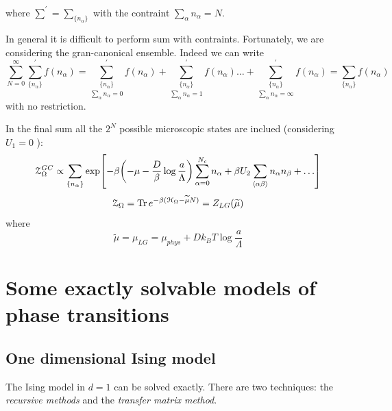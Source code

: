 \documentclass[../main/main.tex]{subfiles}
\begin{document}
where \( \sum_{}^{'} = \sum_{\{ n_ \alpha  \} }^{}     \)  with the contraint \( \sum_{\alpha }^{} n_ \alpha = N   \).
\begin{remark}
In general it is difficult to perform sum with contraints. Fortunately, we are considering the gran-canonical ensemble.
Indeed we can write
\begin{equation}
  \sum_{N=0}^{\infty} \sum_{\{ n_ \alpha  \}}^{'} f(n_ \alpha ) =   \underset{\sum_{\alpha }^{} n_ \alpha =0 }{\sum_{\{ n_ \alpha  \} }^{'}} f (n_ \alpha )  +
  \underset{\sum_{\alpha }^{} n_ \alpha =1 }{\sum_{\{ n_ \alpha  \} }^{'}} f (n_ \alpha )
  \dots +
    \underset{\sum_{\alpha }^{} n_ \alpha = \infty }{\sum_{\{ n_ \alpha  \} }^{'}} f (n_ \alpha ) =  \sum_{\{ n_ \alpha  \}} f(n_ \alpha )
\end{equation}
with no restriction.
\end{remark}
\begin{remark}
In the final sum all the \( 2^N \) possible microscopic states are inclued (considering \( U_1 =0 \) ):
\begin{equation}
  \mathcal{Z}_ \Omega ^{GC} \propto  \sum_{\{ n_ \alpha  \}} \exp [-\beta \qty(-\mu - \frac{D}{\beta } \log{\frac{a}{\Lambda }} ) \sum_{\alpha =0}^{N_c} n_ \alpha  + \beta U_2 \sum_{\expval{\alpha \beta } }^{} n_ \alpha n_ \beta + \dots     ]
\end{equation}
\begin{equation}
  \mathcal{Z}_ \Omega = \Tr e^{-\beta ( \mathcal{H}_ \Omega - \widetilde{\mu} N )} = Z_{LG} ( \widetilde{\mu } )
\end{equation}
where
\begin{equation}
  \widetilde{\mu } = \mu _{LG} = \mu _{phys} + D k_B T \log{\frac{a}{\Lambda }}
\end{equation}
\end{remark}
\clearpage



\chapter{Some exactly solvable models of phase transitions}

\section{One dimensional Ising model}
The Ising model in \( d=1 \) can be solved exactly. There are two techniques: the \emph{recursive methods} and the \emph{transfer matrix method}.
\end{document}
